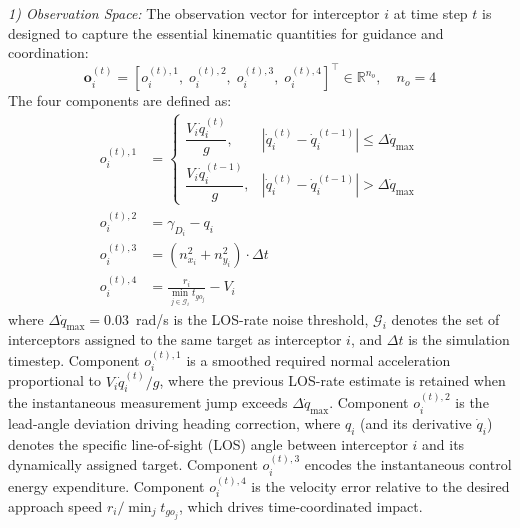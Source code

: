 \documentclass[lettersize,journal]{IEEEtran}
\begin{document}
\emph{1) Observation Space:} The observation vector for interceptor $i$ at time step $t$ is designed to capture the essential kinematic quantities for guidance and coordination:
\begin{equation}
\label{eq:observation_space}
\mathbf{o}_i^{(t)} = \left[o_i^{(t),1},\; o_i^{(t),2},\; o_i^{(t),3},\; o_i^{(t),4}\right]^\top \in \mathbb{R}^{n_o},\quad n_o = 4
\end{equation}
The four components are defined as:
\begin{align}
o_i^{(t),1} &=
\begin{cases}
\dfrac{V_i \dot{q}_i^{(t)}}{g}, &
\left|\dot{q}_i^{(t)} - \dot{q}_i^{(t-1)}\right| \leq \Delta \dot{q}_{\max}
\\[6pt]
\dfrac{V_i \dot{q}_i^{(t-1)}}{g}, &
\left|\dot{q}_i^{(t)} - \dot{q}_i^{(t-1)}\right| > \Delta \dot{q}_{\max}
\end{cases}
\label{eq:o1}
\\[6pt]
o_i^{(t),2} &= \gamma_{D_i} - q_i
\label{eq:o2}
\\[4pt]
o_i^{(t),3} &= \left(n_{x_i}^2 + n_{y_i}^2\right)\cdot \Delta t
\label{eq:o3}
\\[4pt]
o_i^{(t),4} &= \frac{r_i}{\min_{j \in \mathcal{G}_i} t_{go_j}} - V_i
\label{eq:o4}
\end{align}
where $\Delta\dot{q}_{\max} = 0.03$~rad/s is the LOS-rate noise threshold, $\mathcal{G}_i$ denotes the set of interceptors assigned to the same target as interceptor $i$, and $\Delta t$ is the simulation timestep. 
Component $o_i^{(t),1}$ is a smoothed required normal acceleration proportional to $V_i \dot{q}_i^{(t)} / g$, where the previous LOS-rate estimate is retained when the instantaneous measurement jump exceeds $\Delta \dot{q}_{\max}$.
Component $o_i^{(t),2}$ is the lead-angle deviation driving heading correction, where $q_i$ (and its derivative $\dot{q}_i$) denotes the specific line-of-sight (LOS) angle between interceptor $i$ and its dynamically assigned target. 
Component $o_i^{(t),3}$ encodes the instantaneous control energy expenditure. 
Component $o_i^{(t),4}$ is the velocity error relative to the desired approach speed $r_i / \min_j t_{go_j}$, which drives time-coordinated impact.
\end{document}

